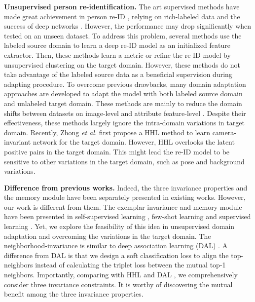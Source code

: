 \documentclass[10pt,twocolumn,letterpaper]{article}
\begin{document}
\textbf{Unsupervised person re-identification.}
The art supervised methods have made great achievement in person re-ID \cite{Li_2018_CVPR,sun2018beyond,zheng2019joint,sun2019dissecting}, relying on rich-labeled data and the success of deep networks \cite{Yawei2019Taking,resnet,dong2019search}. However, the performance may drop significantly when tested on an unseen dataset.
To address this problem, several methods use the labeled source domain to learn a deep re-ID model as an initialized feature extractor. Then, these methods learn a metric \cite{yu2017cross} or refine the re-ID model by unsupervised clustering \cite{fan2017pul} on the target domain. However, these methods do not take advantage of the labeled source data as a beneficial supervision during adapting procedure.
To overcome previous drawbacks, many domain adaptation approaches are developed to adapt the model with both labeled source domain and unlabeled target domain. These methods are mainly to reduce the domain shifts between datasets on image-level \cite{deng2018image,wei2018person,Bak_2018_ECCV} and attribute feature-level \cite{wang2018reid,lin2018multibmvc}. 
Despite their effectiveness, these methods largely ignore the intra-domain variations in target domain. 
Recently, Zhong \emph{et al.} \cite{Zhong_2018_ECCV} first propose a HHL method to learn camera-invariant network for the target domain. However, HHL overlooks the latent positive pairs in the target domain. This might lead the re-ID model to be sensitive to other variations in the target domain, such as pose and background variations.


\textbf{Difference from previous works.} Indeed, the three invariance properties and the memory module have been separately presented in existing works. However, our work is different from them. The exemplar-invariance and memory module have been presented in self-supervised learning \cite{wu2018unsupervised}, few-shot learning \cite{santoro2016meta,vinyals2016matching,wu2018improving} and supervised learning \cite{xiao2017joint}. Yet, we explore the feasibility of this idea in unsupervised domain adaptation and overcoming the variations in the target domain. 
The neighborhood-invariance is similar to deep association learning (DAL) \cite{chen2018deep}. A difference from DAL is that we design a soft classification loss to align the top- neighbors instead of calculating the triplet loss between the mutual top-1 neighbors.
Importantly, comparing with HHL \cite{Zhong_2018_ECCV} and DAL \cite{chen2018deep}, we comprehensively consider three invariance constraints. It is worthy of discovering the mutual benefit among the three invariance properties.
\end{document}
